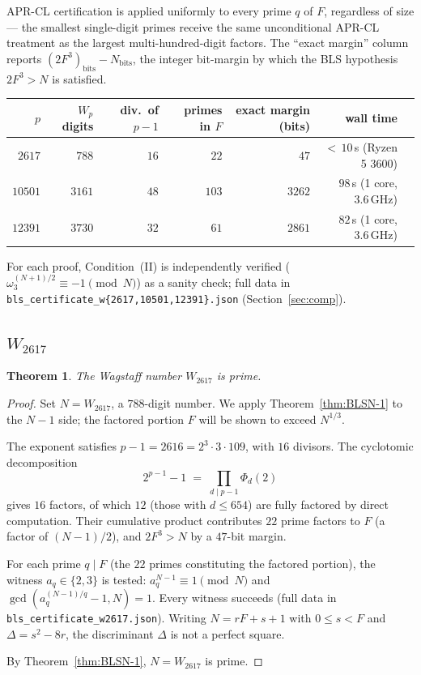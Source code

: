 \documentclass[11pt,a4paper]{amsart}
\theoremstyle{plain}
\newtheorem{theorem}{Theorem}[section]
\theoremstyle{definition}
\newcommand{\wom}{\omega_3}
\begin{document}
APR-CL certification is applied uniformly to every prime $q$ of $F$,
regardless of size --- the smallest single-digit primes receive the
same unconditional APR-CL treatment as the largest multi-hundred-digit
factors. The ``exact margin'' column reports $(2F^3)_{\mathrm{bits}}
- N_{\mathrm{bits}}$, the integer bit-margin by which the BLS
hypothesis $2F^3 > N$ is satisfied.

\begin{center}
\begin{tabular}{rrrrrrr}
\toprule
$p$ & $W_p$ digits & div.\ of $p{-}1$ & primes in $F$ & exact margin (bits) & wall time \\
\midrule
$ 2617$ &  $788$ & $16$ &  $22$ &  $47$ & ${<}\,10$\,s (Ryzen 5 3600) \\
$10501$ & $3161$ & $48$ & $103$ & $3262$ & $98$\,s (1 core, 3.6\,GHz) \\
$12391$ & $3730$ & $32$ & $ 61$ & $2861$ & $82$\,s (1 core, 3.6\,GHz) \\
\bottomrule
\end{tabular}
\end{center}

For each proof, Condition~(II) is independently verified
($\wom^{(N+1)/2} \equiv -1 \pmod N$) as a sanity check; full data in
\texttt{bls\_certificate\_w\{2617,10501,12391\}.json}
(Section~\ref{sec:comp}).

\subsection{$W_{2617}$}
\label{ssec:w2617}

\begin{theorem}
\label{thm:w2617}
The Wagstaff number $W_{2617}$ is prime.
\end{theorem}

\begin{proof}
Set $N = W_{2617}$, a $788$-digit number. We apply
Theorem~\ref{thm:BLSN-1} to the $N - 1$ side; the factored portion
$F$ will be shown to exceed $N^{1/3}$.

The exponent satisfies $p - 1 = 2616 = 2^3 \cdot 3 \cdot 109$, with
$16$ divisors. The cyclotomic decomposition
\[
  2^{p-1} - 1 \;=\; \prod_{d \mid p-1} \Phi_d(2)
\]
gives $16$ factors, of which $12$ (those with $d \leq 654$) are fully
factored by direct computation. Their cumulative product contributes
$22$ prime factors to $F$ (a factor of $(N-1)/2$), and $2 F^3 > N$ by
a $47$-bit margin.

For each prime $q \mid F$ (the $22$ primes constituting the factored
portion), the witness $a_q \in \{2, 3\}$ is tested:
$a_q^{N-1} \equiv 1 \pmod N$ and $\gcd(a_q^{(N-1)/q} - 1, N) = 1$.
Every witness succeeds (full data in
\texttt{bls\_certificate\_w2617.json}). Writing $N = r F + s + 1$
with $0 \leq s < F$ and $\Delta = s^2 - 8 r$, the discriminant
$\Delta$ is not a perfect square.

By Theorem~\ref{thm:BLSN-1}, $N = W_{2617}$ is prime.
\end{proof}
\end{document}
